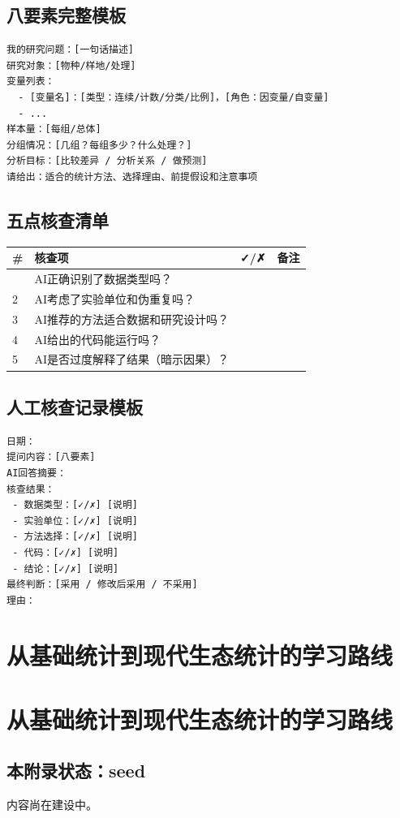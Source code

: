 \documentclass[
  letterpaper,
]{scrbook}
\newcounter{none} %
\begin{document}
\section{八要素完整模板}\label{ux516bux8981ux7d20ux5b8cux6574ux6a21ux677f}

\begin{verbatim}
我的研究问题：[一句话描述]
研究对象：[物种/样地/处理]
变量列表：
  - [变量名]：[类型：连续/计数/分类/比例]，[角色：因变量/自变量]
  - ...
样本量：[每组/总体]
分组情况：[几组？每组多少？什么处理？]
分析目标：[比较差异 / 分析关系 / 做预测]
请给出：适合的统计方法、选择理由、前提假设和注意事项
\end{verbatim}

\section{五点核查清单}\label{ux4e94ux70b9ux6838ux67e5ux6e05ux5355}

{\def\LTcaptype{none} %
\begin{longtable}[]{@{}llll@{}}
\toprule\noalign{}
\# & 核查项 & ✓/✗ & 备注 \\
\midrule\noalign{}
\endhead
\bottomrule\noalign{}
\endlastfoot
1 & AI正确识别了数据类型吗？ & & \\
2 & AI考虑了实验单位和伪重复吗？ & & \\
3 & AI推荐的方法适合数据和研究设计吗？ & & \\
4 & AI给出的代码能运行吗？ & & \\
5 & AI是否过度解释了结果（暗示因果）？ & & \\
\end{longtable}
}

\section{人工核查记录模板}\label{ux4ebaux5de5ux6838ux67e5ux8bb0ux5f55ux6a21ux677f}

\begin{verbatim}
日期：
提问内容：[八要素]
AI回答摘要：
核查结果：
 - 数据类型：[✓/✗] [说明]
 - 实验单位：[✓/✗] [说明]
 - 方法选择：[✓/✗] [说明]
 - 代码：[✓/✗] [说明]
 - 结论：[✓/✗] [说明]
最终判断：[采用 / 修改后采用 / 不采用]
理由：
\end{verbatim}

\chapter{从基础统计到现代生态统计的学习路线}\label{ux4eceux57faux7840ux7edfux8ba1ux5230ux73b0ux4ee3ux751fux6001ux7edfux8ba1ux7684ux5b66ux4e60ux8defux7ebf}

\chapter{从基础统计到现代生态统计的学习路线}\label{ux4eceux57faux7840ux7edfux8ba1ux5230ux73b0ux4ee3ux751fux6001ux7edfux8ba1ux7684ux5b66ux4e60ux8defux7ebf-1}

\section{本附录状态：seed}\label{ux672cux9644ux5f55ux72b6ux6001seed-4}

内容尚在建设中。


\backmatter
\end{document}
